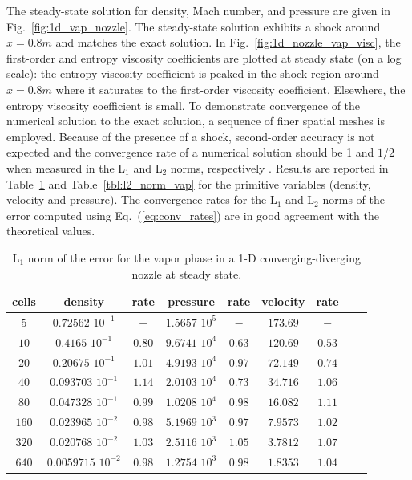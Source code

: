 \documentclass[review,10pt]{elsarticle}
\newcommand{\eqt}[1]{Eq.~(\ref{#1})}                     %
\newcommand{\fig}[1]{Fig.~\ref{#1}}                      %
\newcommand{\tbl}[1]{Table~\ref{#1}}                     %
\begin{document}
%
The steady-state solution for density, Mach number, and pressure are given in \fig{fig:1d_vap_nozzle}. 
The steady-state solution exhibits a shock around $x=0.8m$ and matches the exact solution. In \fig{fig:1d_nozzle_vap_visc}, 
the first-order and entropy viscosity coefficients are plotted at steady state (on a log scale): the entropy viscosity 
coefficient is peaked in the shock region around $x=0.8m$ where it saturates to the first-order viscosity 
coefficient. 
Elsewhere, the entropy  viscosity coefficient is small. 
To demonstrate convergence of the numerical solution to the exact solution, a sequence of finer spatial meshes is employed. Because 
of the presence of a shock, second-order accuracy is not expected and the convergence rate of a numerical solution 
should be 1 and $1/2$ when measured in the L$_1$ and L$_2$ norms, respectively \cite{banks-jeffrey, majda-andrew}. 
Results are reported in \tbl{tbl:l1_norm_vap} and \tbl{tbl:l2_norm_vap} for the primitive variables (density, 
velocity and pressure). The convergence rates for the L$_1$ and L$_2$ norms of the error computed using \eqt{eq:conv_rates} 
are in good agreement with the theoretical values.
%
\begin{table}[!htbp]
\begin{center}
 \caption{\label{tbl:l1_norm_vap} L$_1$ norm of the error for the vapor phase in a 1-D converging-diverging nozzle at steady state.}
 \begin{tabular}{|c|c|c|c|c|c|c|c|c|}
 \hline
cells & density              & rate      & pressure          & rate      & velocity & rate      \\ \hline
$5$  & $0.72562$   $10^{-1}$ & $-$       & $1.5657$ $10^{5}$ & $-$       & $173.69$ & $-$       \\ \hline
$10$ & $0.4165$    $10^{-1}$ & $0.80$ & $9.6741$ $10^{4}$ & $0.63$ & $120.69$ & $0.53$ \\ \hline
$20$ & $0.20675$   $10^{-1}$ & $1.01$  & $4.9193$ $10^{4}$ & $0.97$ & $72.149$ & $0.74$ \\ \hline
$40$ & $0.093703$  $10^{-1}$ & $1.14$  & $2.0103$ $10^{4}$ & $0.73$ & $34.716$ & $1.06$  \\ \hline
$80$ & $0.047328$  $10^{-1}$ & $0.99$  & $1.0208$ $10^{4}$ & $0.98$  & $16.082$ & $1.11$  \\ \hline
$160$& $0.023965$  $10^{-2}$ & $0.98$  & $5.1969$ $10^{3}$ & $0.97$  & $7.9573$ & $1.02$  \\ \hline
$320$& $0.020768$  $10^{-2}$ & $1.03$  & $2.5116$ $10^{3}$ & $1.05$  & $3.7812$ & $1.07$  \\ \hline
$640$& $0.0059715$ $10^{-2}$ & $0.98$  & $1.2754$ $10^{3}$ & $0.98$  & $1.8353$ & $1.04$  \\ \hline
\end{tabular}
\end{center}
\nonumber
\end{table}
\end{document}
